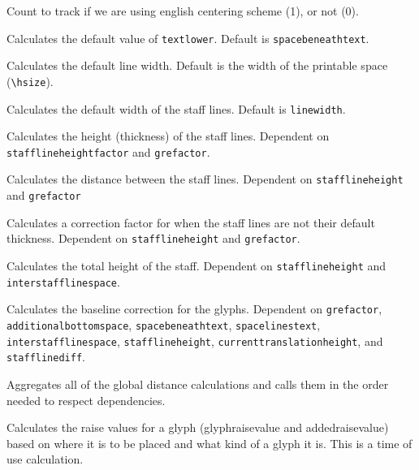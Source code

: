 Count to track if we are using english centering scheme (1), or not (0).

Calculates the default value of \texttt{textlower}.  Default is \texttt{spacebeneathtext}.

Calculates the default line width.  Default is the width of the printable space (\verb=\hsize=).

Calculates the default width of the staff lines.  Default is \texttt{linewidth}.

Calculates the height (thickness) of the staff lines.  Dependent on \texttt{stafflineheightfactor} and \texttt{grefactor}.

Calculates the distance between the staff lines.  Dependent on \texttt{stafflineheight} and \texttt{grefactor}

Calculates a correction factor for when the staff lines are not their default thickness.  Dependent on \texttt{stafflineheight} and \texttt{grefactor}.

Calculates the total height of the staff.  Dependent on \texttt{stafflineheight} and \texttt{interstafflinespace}.

Calculates the baseline correction for the glyphs.  Dependent on \texttt{grefactor}, \texttt{additionalbottomspace}, \texttt{spacebeneathtext}, \texttt{spacelinestext}, \texttt{interstafflinespace}, \texttt{stafflineheight}, \texttt{currenttranslationheight}, and \texttt{stafflinediff}.

Aggregates all of the global distance calculations and calls them in the order needed to respect dependencies.

Calculates the raise values for a glyph (glyphraisevalue and addedraisevalue) based on where it is to be placed and what kind of a glyph it is.  This is a time of use calculation.

